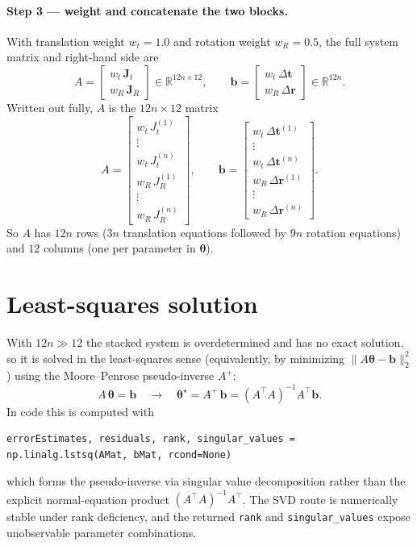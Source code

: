 \documentclass[11pt]{article}
\newcommand{\R}{\mathbb{R}}
\begin{document}
\paragraph{Step 3 --- weight and concatenate the two blocks.}
With translation weight $w_t = 1.0$ and rotation weight $w_R = 0.5$, the full system
matrix and right-hand side are
\begin{equation}
A =
\begin{bmatrix} w_t\,\mathbf{J}_t \\[4pt] w_R\,\mathbf{J}_R \end{bmatrix} \in \R^{12n\times12},
\qquad
\bm{b} =
\begin{bmatrix} w_t\,\Delta\mathbf{t} \\[4pt] w_R\,\Delta\mathbf{r} \end{bmatrix} \in \R^{12n}.
\end{equation}
Written out fully, $A$ is the $12n \times 12$ matrix
\begin{equation}
A =
\begin{bmatrix}
w_t\,J_t^{(1)} \\ \vdots \\ w_t\,J_t^{(n)} \\[3pt]
w_R\,J_R^{(1)} \\ \vdots \\ w_R\,J_R^{(n)}
\end{bmatrix},
\qquad
\bm{b} =
\begin{bmatrix}
w_t\,\Delta\bm{t}^{(1)} \\ \vdots \\ w_t\,\Delta\bm{t}^{(n)} \\[3pt]
w_R\,\Delta\bm{r}^{(1)} \\ \vdots \\ w_R\,\Delta\bm{r}^{(n)}
\end{bmatrix}.
\end{equation}
So $A$ has $12n$ rows ($3n$ translation equations followed by $9n$ rotation
equations) and $12$ columns (one per parameter in $\bm{\theta}$).

\section{Least-squares solution}
With $12n \gg 12$ the stacked system is overdetermined and has no exact solution, so
it is solved in the least-squares sense (equivalently, by minimizing
$\lVert A\bm{\theta} - \bm{b}\rVert_2^2$) using the Moore--Penrose pseudo-inverse
$A^{+}$:
\begin{equation}
A\,\bm{\theta} = \bm{b}
\quad\longrightarrow\quad
\bm{\theta}^{\star} = A^{+}\,\bm{b} = (A^\top A)^{-1} A^\top \bm{b}.
\end{equation}
In code this is computed with
\begin{lstlisting}
errorEstimates, residuals, rank, singular_values = np.linalg.lstsq(AMat, bMat, rcond=None)
\end{lstlisting}
which forms the pseudo-inverse via singular value decomposition rather than the
explicit normal-equation product $(A^\top A)^{-1} A^\top$. The SVD route is
numerically stable under rank deficiency, and the returned \texttt{rank} and
\texttt{singular\_values} expose unobservable parameter combinations.
\end{document}
